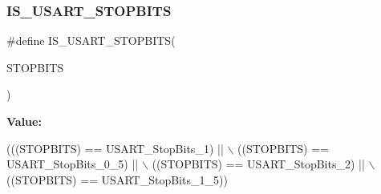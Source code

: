 \subsubsection{\texorpdfstring{I\+S\+\_\+\+U\+S\+A\+R\+T\+\_\+\+S\+T\+O\+P\+B\+I\+TS}{IS\_USART\_STOPBITS}}
{\footnotesize\ttfamily \#define I\+S\+\_\+\+U\+S\+A\+R\+T\+\_\+\+S\+T\+O\+P\+B\+I\+TS(\begin{DoxyParamCaption}\item[{}]{S\+T\+O\+P\+B\+I\+TS }\end{DoxyParamCaption})}

{\bfseries Value\+:}
\begin{DoxyCode}
(((STOPBITS) == USART\_StopBits\_1) || \(\backslash\)
                                     ((STOPBITS) == USART\_StopBits\_0\_5) || \(\backslash\)
                                     ((STOPBITS) == USART\_StopBits\_2) || \(\backslash\)
                                     ((STOPBITS) == USART\_StopBits\_1\_5))
\end{DoxyCode}
